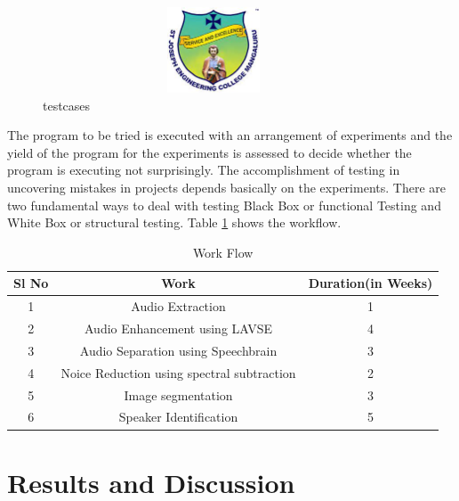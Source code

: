 \documentclass[12pt,a4paper]{report}
\begin{document}
\begin{figure}[h!]
\centering
\includegraphics[width=4in,height=1in]{pic/sjeclogo.png}
\caption{testcases}
\label{fig:pic4}
\end{figure}
The program to be tried is executed with an arrangement of experiments and the yield of
the program for the experiments is assessed to decide whether the program is executing
not surprisingly. The accomplishment of testing in uncovering mistakes in projects
depends basically on the experiments. There are two fundamental ways to deal with
testing Black Box or functional Testing and White Box or structural testing. Table \ref{tab:t1} shows the workflow. 
\begin{table} [htb]
\caption {Work Flow}
\vspace{0.25in}
\begin{tabular}{|c|c|c|}\hline
\textbf{Sl No}& \textbf{Work} & \textbf{Duration(in Weeks)}\\[6pt] \hline \normalsize
1&Audio Extraction&1 \\ \hline
2&Audio Enhancement using LAVSE&4\\ \hline
3&Audio Separation using Speechbrain&3\\ \hline
4&Noice Reduction using spectral subtraction&2\\ \hline
5&Image segmentation&3\\ \hline
6&Speaker Identification&5\\ \hline
\end{tabular}
\label{tab:t1}
\end{table}



\chapter{Results and Discussion}
\end{document}

